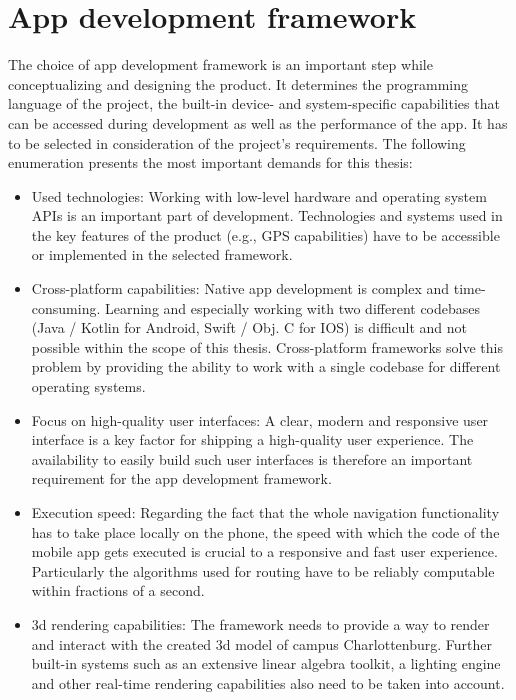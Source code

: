 \section{App development framework}
The choice of app development framework is an important step while conceptualizing and designing the product. It determines the programming language of the project, the built-in device- and system-specific capabilities that can be accessed during development as well as the performance of the app. It has to be selected in consideration of the project's requirements. The following enumeration presents the most important demands for this thesis:
\begin{itemize}
    \item Used technologies: Working with low-level hardware and operating system APIs is an important part of development. Technologies and systems used in the key features of the product (e.g., GPS capabilities) have to be accessible or implemented in the selected framework.
    \item Cross-platform capabilities: Native app development is complex and time-consuming. Learning and especially working with two different codebases (Java / Kotlin for Android, Swift / Obj. C for IOS) is difficult and not possible within the scope of this thesis. Cross-platform frameworks solve this problem by providing the ability to work with a single codebase for different operating systems.
    \item Focus on high-quality user interfaces: A clear, modern and responsive user interface is a key factor for shipping a high-quality user experience. The availability to easily build such user interfaces is therefore an important requirement for the app development framework. 
    \item Execution speed: Regarding the fact that the whole navigation functionality has to take place locally on the phone, the speed with which the code of the mobile app gets executed is crucial to a responsive and fast user experience. Particularly the algorithms used for routing have to be reliably computable within fractions of a second.
    \item 3d rendering capabilities: The framework needs to provide a way to render and interact with the created 3d model of campus Charlottenburg. Further built-in systems such as an extensive linear algebra toolkit, a lighting engine and other real-time rendering capabilities also need to be taken into account.
\end{itemize}

